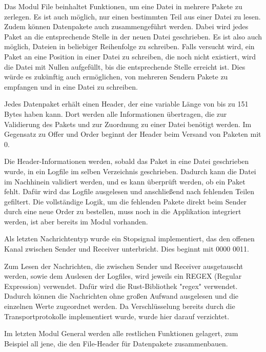 Das Modul File beinhaltet Funktionen, um eine Datei in mehrere Pakete zu zerlegen. Es ist auch möglich, nur einen bestimmten Teil aus einer Datei zu lesen.
Zudem können Datenpakete auch zusammengeführt werden. Dabei wird jedes Paket an die entsprechende Stelle in der neuen Datei geschrieben. Es ist also auch möglich, Dateien in beliebiger Reihenfolge zu schreiben. Falls versucht wird, ein Paket an eine Position in einer Datei zu schreiben, die noch nicht existiert, wird die Datei mit Nullen aufgefüllt, bis die entsprechende Stelle erreicht ist.
Dies würde es zukünftig auch ermöglichen, von mehreren Sendern Pakete zu empfangen und in eine Datei zu schreiben.

Jedes Datenpaket erhält einen Header, der eine variable Länge von bis zu 151 Bytes haben kann. Dort werden alle Informationen übertragen, die zur Validierung des Pakets und zur Zuordnung zu einer Datei benötigt werden.
Im Gegensatz zu Offer und Order beginnt der Header beim Versand von Paketen mit 0.

Die Header-Informationen werden, sobald das Paket in eine Datei geschrieben wurde, in ein Logfile im selben Verzeichnis geschrieben. Dadurch kann die Datei im Nachhinein validiert werden, und es kann überprüft werden, ob ein Paket fehlt. Dafür wird das Logfile ausgelesen und anschließend nach fehlenden Teilen gefiltert.
Die vollständige Logik, um die fehlenden Pakete direkt beim Sender durch eine neue Order zu bestellen, muss noch in die Applikation integriert werden, ist aber bereits im Modul vorhanden.

Als letzten Nachrichtentyp wurde ein Stopsignal implementiert, das den offenen Kanal zwischen Sender und Receiver unterbricht. Dies beginnt mit 0000 0011.

Zum Lesen der Nachrichten, die zwischen Sender und Receiver ausgetauscht werden, sowie dem Auslesen der Logfiles, wird jeweils ein REGEX (Regular Expression) verwendet. Dafür wird die Rust-Bibliothek "regex" verwendet.
Dadurch können die Nachrichten ohne großen Aufwand ausgelesen und die einzelnen Werte zugeordnet werden.
Da Verschlüsselung bereits durch die Transportprotokolle implementiert wurde, wurde hier darauf verzichtet.

Im letzten Modul General werden alle restlichen Funktionen gelagert, zum Beispiel all jene, die den File-Header für Datenpakete zusammenbauen.
